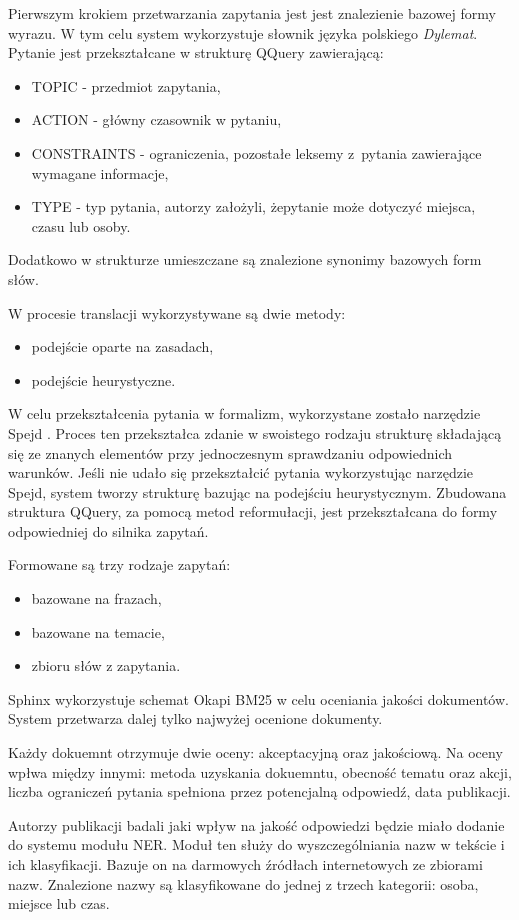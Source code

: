 Pierwszym krokiem przetwarzania zapytania jest jest znalezienie bazowej formy wyrazu. W tym celu system wykorzystuje słownik języka polskiego \textit{Dylemat}. Pytanie jest przekształcane w strukturę QQuery zawierającą:
\begin{itemize}
	\item TOPIC - przedmiot zapytania,
	\item ACTION - główny czasownik w pytaniu,
	\item CONSTRAINTS - ograniczenia, pozostałe leksemy z~pytania zawierające wymagane informacje,
	\item TYPE - typ pytania, autorzy założyli, żepytanie może dotyczyć miejsca, czasu lub osoby.
\end{itemize}
Dodatkowo w strukturze umieszczane są znalezione synonimy bazowych form słów.

W procesie translacji wykorzystywane są dwie metody: 
\begin{itemize}
	\item podejście oparte na zasadach, 
	\item podejście heurystyczne.
\end{itemize}
W celu przekształcenia pytania w formalizm, wykorzystane zostało narzędzie Spejd \cite{spejd}. Proces ten przekształca zdanie w swoistego rodzaju strukturę składającą się ze znanych elementów przy jednoczesnym sprawdzaniu odpowiednich warunków. Jeśli nie udało się przekształcić pytania wykorzystując narzędzie Spejd, system tworzy strukturę bazując na podejściu heurystycznym. Zbudowana struktura QQuery, za pomocą metod reformułacji, jest przekształcana do formy odpowiedniej do silnika zapytań.

Formowane są trzy rodzaje zapytań:
\begin{itemize}
	\item bazowane na frazach,
	\item bazowane na temacie,
	\item zbioru słów z zapytania.
\end{itemize}

Sphinx wykorzystuje schemat Okapi BM25 w celu oceniania jakości dokumentów. System przetwarza dalej tylko najwyżej ocenione dokumenty.

Każdy dokuemnt otrzymuje dwie oceny: akceptacyjną oraz jakościową. Na oceny wpłwa między innymi: metoda uzyskania dokuemntu, obecność tematu oraz akcji, liczba ograniczeń pytania spełniona przez potencjalną odpowiedź, data publikacji.

Autorzy publikacji \cite{polishQAS} badali jaki wpływ na jakość odpowiedzi będzie miało dodanie do systemu modułu NER. Moduł ten służy do wyszczególniania nazw w tekście i ich klasyfikacji. Bazuje on na darmowych źródłach internetowych ze zbiorami nazw. Znalezione nazwy są klasyfikowane do jednej z trzech kategorii: osoba, miejsce lub czas.

